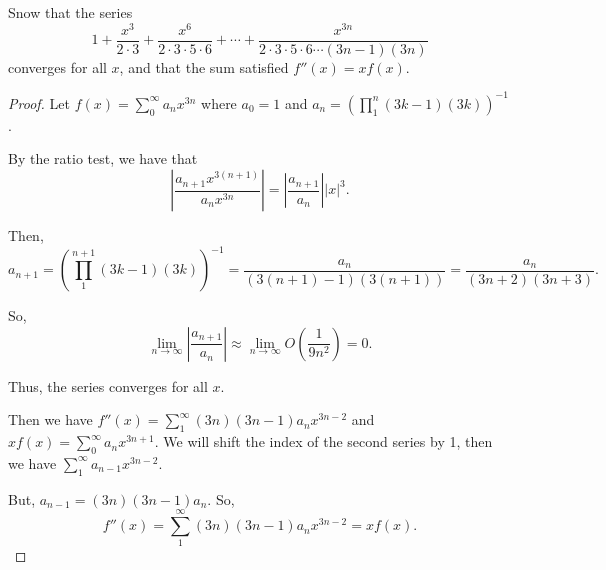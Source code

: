 \documentclass[../hw3]{subfiles}
\begin{document}
\begin{problem}
Snow that the series \[
	1+\frac{x^3}{2\cdot 3} + \frac{x^6}{2\cdot 3\cdot 5\cdot 6} + \cdots+\frac{x^{3n}}{2\cdot 3\cdot 5\cdot 6\cdots(3n-1)(3n)}
\] converges for all $x$, and that the sum satisfied  $f''(x)=xf(x)$.
\end{problem}
\begin{proof}
	Let $f(x)=\sum_{0}^{\infty} a_n x^{3n}$ where $a_0=1$ and $a_n = {\left( \prod_1^n (3k-1)(3k) \right)}^{-1} $.

	By the ratio test, we have that \[
		\left| \frac{a_{n+1}x^{3(n+1)}}{a_n x^{3n}} \right| = \left| \frac{a_{n+1}}{a_n} \right| |x|^3
		.\]

	Then,\[
		a_{n+1} = {\left( \prod_1^{n+1}(3k-1)(3k) \right) }^{-1} = \frac{a_n}{(3(n+1)-1)(3(n+1))}=\frac{a_n}{(3n+2)(3n+3)}
		.\]

	So, \[
		\lim_{n \to \infty} \left| \frac{a_{n+1}}{a_n} \right| \approx \lim_{n \to \infty} O\left( \frac{1}{9n^2} \right) = 0
		.\]

	Thus, the series converges for all $x$.

	Then we have $f''(x)=\sum_{1}^{\infty} (3n)(3n-1)a_n x^{3n-2}$ and $xf(x) = \sum_{0}^{\infty} a_n x^{3n+1}.$
	We will shift the index of the second series by 1, then we have $\sum_{1}^{\infty} a_{n-1}x^{3n-2}$.

	But, $a_{n-1}=(3n)(3n-1)a_n$.
	So, \[
		f''(x)=\sum_{1}^{\infty} (3n)(3n-1)a_n x^{3n-2} = xf(x)
		.\]
\end{proof}
\end{document}
